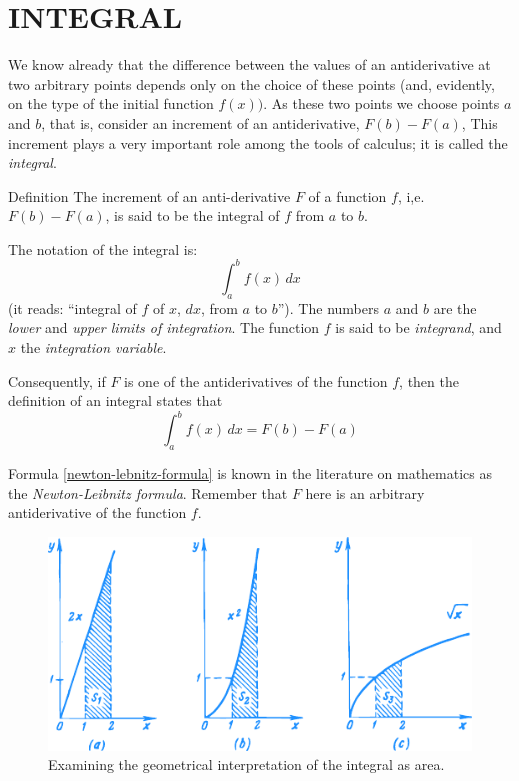 

\chapter{INTEGRAL}
\label{integral}

\athr We know already that the difference between the values of an antiderivative at two arbitrary points depends only on the choice of these points (and, evidently, on the type of the initial function $f (x))$. As these two points we choose points $a$ and $b$, that is, consider an increment of an antiderivative, $F (b) - F (a)$, This increment plays a very important role among the tools of calculus; it is called the \emph{integral}.
\begin{mytheo}{Definition}
The increment of an anti-derivative $F$ of a function $f$, i,e. $F(b)- F(a)$, is said to be the integral of $f$ from $a$ to $b$.
\end{mytheo}
The notation of the integral is:
\begin{equation*}%
\int_{a}^{b} f(x) \, dx
\end{equation*}
(it reads: ``integral of $f$ of $x$, $dx$, from $a$ to $b$''). The numbers $a$ and $b$ are the \emph{lower} and \emph{upper limits of integration}. The function $f$ is said to be \emph{integrand}, and $x$ the \emph{integration variable}.

Consequently, if $F$ is one of the antiderivatives of the function $f$, then the definition of an integral states that 
\begin{equation}%
\boxed{\int_{a}^{b} f(x) \, dx = F(b)- F(a)}
\label{newton-lebnitz-formula}
\end{equation}

Formula \eqref{newton-lebnitz-formula} is known in the literature on mathematics as the \emph{Newton-Leibnitz formula}. Remember that $F$ here is an arbitrary antiderivative of the function $f$.
\begin{figure}[!ht]%
\centering
\includegraphics[width=.9\textwidth]{figures/fig-49.pdf}
\caption{Examining the geometrical interpretation of the integral as area.}
\label{fig-49}
\end{figure}

